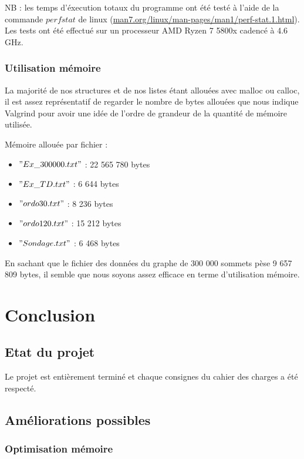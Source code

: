 \documentclass{article}
\begin{document}
NB : les temps d'éxecution totaux du programme ont été testé à l'aide de la commande $perf stat$ de linux (\href{https://man7.org/linux/man-pages/man1/perf-stat.1.html}{man7.org/linux/man-pages/man1/perf-stat.1.html}). Les tests ont été effectué sur un processeur AMD Ryzen 7 5800x cadencé à 4.6 GHz.

\subsubsection{Utilisation mémoire}

La majorité de nos structures et de nos listes étant allouées avec malloc ou calloc, il est assez représentatif de regarder le nombre de bytes allouées que nous indique Valgrind pour avoir une idée de l'ordre de grandeur de la quantité de mémoire utilisée.

Mémoire allouée par fichier :
\begin{itemize}
\item $"Ex\_300000.txt"$ : 22 565 780 bytes
\item $"Ex\_TD.txt"$ : 6 644 bytes
\item $"ordo30.txt"$ : 8 236 bytes
\item $"ordo120.txt"$ : 15 212 bytes
\item $"Sondage.txt"$ : 6 468 bytes
\end{itemize}

En sachant que le fichier des données du graphe de 300 000 sommets pèse 9 657 809 bytes, il semble que nous soyons assez efficace en terme d'utilisation mémoire.

\section{Conclusion}

\subsection{Etat du projet}

Le projet est entièrement terminé et chaque consignes du cahier des charges a été respecté.

\subsection{Améliorations possibles}

\subsubsection{Optimisation mémoire}
\end{document}
